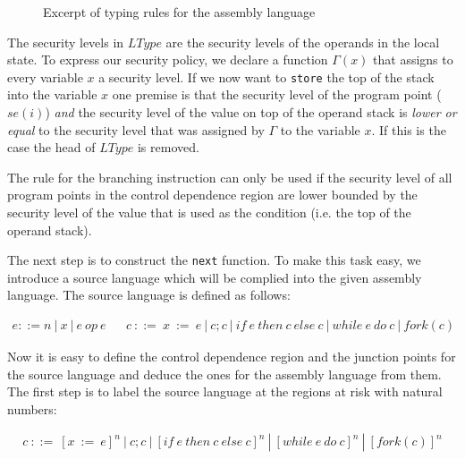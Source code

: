 \documentclass[a4paper,10pt]{llncs}
\begin{document}
\begin{figure}
\begin{prooftree}
\end{prooftree}

\begin{prooftree}
\end{prooftree}
\caption{Excerpt of typing rules for the assembly language}
\label{fig:transfer-rules}
\end{figure}

The security levels in $LType$ are the security levels of the operands in the local state. To
express our security policy, we declare a function $\Gamma(x)$ that assigns to every variable
$x$ a security level. If we now want to \texttt{store} the top of the stack into the variable
$x$ one premise is that the security level of the program point ($se(i)$) \textit{and} the
security level of the value on top of the operand stack is \textit{lower or equal} to the
security level that was assigned by $\Gamma$ to the variable $x$. If this is the case the head
of $LType$ is removed.

The rule for the branching instruction can only be used if the security level of all program
points in the control dependence region are lower bounded by the security level of the value
that is used as the condition (i.e. the top of the operand stack). 

The next step is to construct the \texttt{next} function. To make this task easy, we introduce
a source language which will be complied into the given assembly language. The source language
is defined as follows:

\begin{align*}
e ::= n\ |\ x\ |\ e\ op\ e && c\ ::=\ x\ :=\ e\ |\ c;c\ |\ if\ e\ then\ c\ else\ c\ |\ while\ e\ do\ c\ |\ fork(c)
\end{align*}

Now it is easy to define the control dependence region and the junction points for the source
language and deduce the ones for the assembly language from them. The first step is to label the
source language at the regions at risk with natural numbers:

\begin{align*}
c\ ::=\ [x\ :=\ e]^n\ |\ c;c\ |\ [if\ e\ then\ c\ else\ c]^n\ |\ [while\ e\ do\ c]^n\ |\ [fork(c)]^n
\end{align*}
\end{document}

